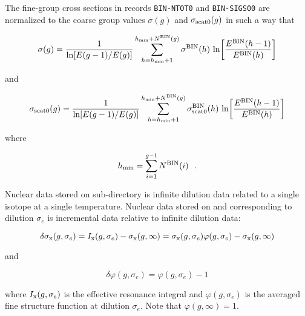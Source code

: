 \vskip 0.2cm

The fine-group cross sections in records {\tt BIN-NTOT0} and {\tt BIN-SIGS00}
are normalized to the coarse group values $\sigma(g)$ and $\sigma_{\rm scat0}(g)$ in such a way that

$$\sigma(g)={1 \over {\rm ln}[E(g-1) / E(g)]} \sum_{h=h_{\rm min}+1}^{h_{\rm min}+N^{\rm BIN}(g)} {\sigma^{\rm BIN}(h)} \ {\rm ln} \biggl[{E^{\rm BIN}(h-1)\over E^{\rm BIN}(h)} \biggr]$$

\noindent and

$$\sigma_{\rm scat0}(g)={1 \over {\rm ln}[E(g-1) / E(g)]} \sum_{h=h_{\rm min}+1}^{h_{\rm min}+N^{\rm BIN}(g)} {\sigma^{\rm BIN}_{\rm scat0}(h)} \ {\rm ln} \biggl[{E^{\rm BIN}(h-1)\over E^{\rm BIN}(h)} \biggr]$$

\noindent where

$$h_{\rm min}=\sum_{i=1}^{g-1}{N^{\rm BIN}(i)} \ \ .$$

\vskip 0.2cm

Nuclear data stored on sub-directory  is infinite dilution data related to a single isotope
at a single temperature. Nuclear
data stored on  and corresponding to dilution $\sigma_e$ is incremental
data relative to infinite dilution data:

$$\delta\sigma_{\rm x}(g,\sigma_e)=I_{\rm x}(g,\sigma_e)-\sigma_{\rm x}(g,\infty)=\sigma_{\rm x}(g,\sigma_e)\varphi(g,\sigma_e)-\sigma_{\rm x}(g,\infty)$$

\noindent and

$$\delta\varphi(g,\sigma_e)=\varphi(g,\sigma_e)-1$$

\noindent where $I_{\rm x}(g,\sigma_e)$ is the effective resonance integral and $\varphi(g,\sigma_e)$ is the averaged fine
structure function at dilution $\sigma_e$. Note that $\varphi(g,\infty)=1$.

\eject
